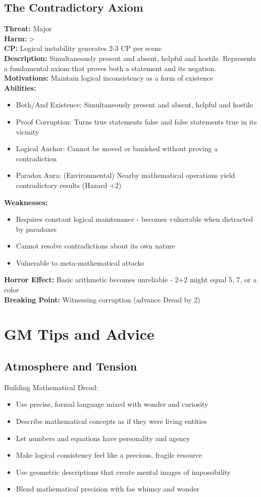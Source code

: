 \documentclass[11pt]{article}
\newenvironment{monsterentry}[1]{%
  \begin{mdframed}[backgroundcolor=shadecolor, linewidth=0pt, leftmargin=0pt, rightmargin=0pt]%
  \subsection*{#1}%
}{%
  \end{mdframed}%
}
\begin{document}
\begin{monsterentry}{The Contradictory Axiom}
\textbf{Threat:} Major \\
\textbf{Harm:} \textgreater \\
\textbf{CP:} Logical instability generates 2-3 CP per scene \\
\textbf{Description:} Simultaneously present and absent, helpful and hostile. Represents a fundamental axiom that proves both a statement and its negation. \\
\textbf{Motivations:} Maintain logical inconsistency as a form of existence \\
\textbf{Abilities:}
\begin{itemize}
\item Both/And Existence: Simultaneously present and absent, helpful and hostile
\item Proof Corruption: Turns true statements false and false statements true in its vicinity
\item Logical Anchor: Cannot be moved or banished without proving a contradiction
\item Paradox Aura: (Environmental) Nearby mathematical operations yield contradictory results (Hazard +2)
\end{itemize}
\textbf{Weaknesses:}
\begin{itemize}
\item Requires constant logical maintenance - becomes vulnerable when distracted by paradoxes
\item Cannot resolve contradictions about its own nature
\item Vulnerable to meta-mathematical attacks
\end{itemize}
\textbf{Horror Effect:} Basic arithmetic becomes unreliable - 2+2 might equal 5, 7, or a color \\
\textbf{Breaking Point:} Witnessing corruption (advance Dread by 2)
\end{monsterentry}

\section{GM Tips and Advice}

\subsection{Atmosphere and Tension}

Building Mathematical Dread:
\begin{itemize}
\item Use precise, formal language mixed with wonder and curiosity
\item Describe mathematical concepts as if they were living entities
\item Let numbers and equations have personality and agency
\item Make logical consistency feel like a precious, fragile resource
\item Use geometric descriptions that create mental images of impossibility
\item Blend mathematical precision with fae whimsy and wonder
\end{itemize}
\end{document}
